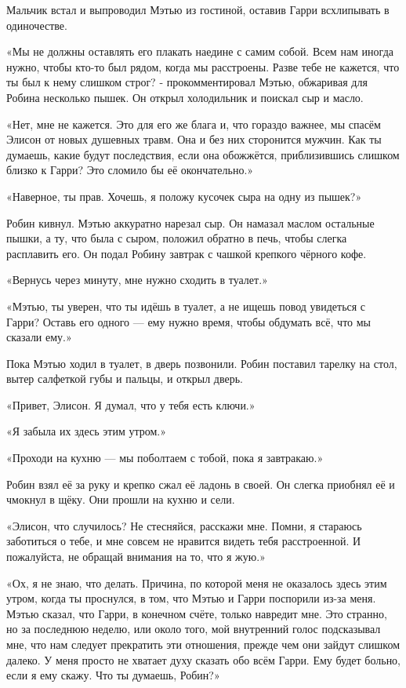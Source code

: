 \documentclass[a4paper,12pt]{book}
\begin{document}
Мальчик встал и выпроводил Мэтью из гостиной, оставив Гарри всхлипывать в одиночестве.
\par
«Мы не должны оставлять его плакать наедине с самим собой. Всем нам иногда нужно, чтобы кто-то был рядом, когда мы расстроены. Разве тебе не кажется, что ты был к нему слишком строг? - прокомментировал Мэтью, обжаривая для Робина несколько пышек. Он открыл холодильник и поискал сыр и масло.
\par
«Нет, мне не кажется. Это для его же блага и, что гораздо важнее, мы спасём Элисон от новых душевных травм. Она и без них сторонится мужчин. Как ты думаешь, какие будут последствия, если она обожжётся, приблизившись слишком близко к Гарри? Это сломило бы её окончательно.»
\par
«Наверное, ты прав. Хочешь, я положу кусочек сыра на одну из пышек?»
\par
Робин кивнул. Мэтью аккуратно нарезал сыр. Он намазал маслом остальные пышки, а ту, что была с сыром, положил обратно в печь, чтобы слегка расплавить его. Он подал Робину завтрак с чашкой крепкого чёрного кофе.
\par
«Вернусь через минуту, мне нужно сходить в туалет.»
\par
«Мэтью, ты уверен, что ты идёшь в туалет, а не ищешь повод увидеться с Гарри? Оставь его одного — ему нужно время, чтобы обдумать всё, что мы сказали ему.»
\par
Пока Мэтью ходил в туалет, в дверь позвонили. Робин поставил тарелку на стол, вытер салфеткой губы и пальцы, и открыл дверь.
\par
«Привет, Элисон. Я думал, что у тебя есть ключи.»
\par
«Я забыла их здесь этим утром.»
\par
«Проходи на кухню — мы поболтаем с тобой, пока я завтракаю.»
\par
Робин взял её за руку и крепко сжал её ладонь в своей. Он слегка приобнял её и чмокнул в щёку. Они прошли на кухню и сели.
\par
«Элисон, что случилось? Не стесняйся, расскажи мне. Помни, я стараюсь заботиться о тебе, и мне совсем не нравится видеть тебя расстроенной. И пожалуйста, не обращай внимания на то, что я жую.»
\par
«Ох, я не знаю, что делать. Причина, по которой меня не оказалось здесь этим утром, когда ты проснулся, в том, что Мэтью и Гарри поспорили из-за меня. Мэтью сказал, что Гарри, в конечном счёте, только навредит мне. Это странно, но за последнюю неделю, или около того, мой внутренний голос подсказывал мне, что нам следует прекратить эти отношения, прежде чем они зайдут слишком далеко. У меня просто не хватает духу сказать обо всём Гарри. Ему будет больно, если я ему скажу. Что ты думаешь, Робин?»
\end{document}
